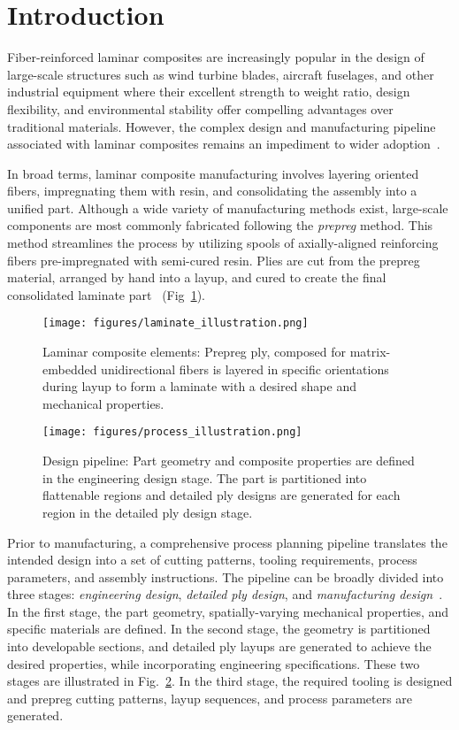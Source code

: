 \section{Introduction}
\label{sec:intro}
Fiber-reinforced laminar composites are increasingly popular in the design of large-scale structures such as wind turbine blades, aircraft fuselages, and other industrial equipment where their excellent strength to weight ratio, design flexibility, and environmental stability offer compelling advantages over traditional materials. However, the complex design and manufacturing pipeline associated with laminar composites remains an impediment to wider adoption~\cite{Grand_View_Research_2024}. 

In broad terms, laminar composite manufacturing involves layering oriented fibers, impregnating them with resin, and consolidating the assembly into a unified part. Although a wide variety of manufacturing methods exist, large-scale components are most commonly fabricated following the \emph{prepreg} method. This method streamlines the process by utilizing spools of axially-aligned reinforcing fibers pre-impregnated with semi-cured resin. Plies are cut from the prepreg material, arranged by hand into a layup, and cured to create the final consolidated laminate part~\cite{staab2015laminar} (Fig~\ref{fig:laminate_illustation}).

\begin{figure}
    \centering
    \texttt{[image: figures/laminate\_illustration.png]}
    \caption{Laminar composite elements: Prepreg ply, composed for matrix-embedded unidirectional fibers is layered in specific orientations during layup to form a laminate with a desired shape and mechanical properties.}
    \label{fig:laminate_illustation}
\end{figure}

\begin{figure}
    \centering
    \texttt{[image: figures/process\_illustration.png]}
    \caption{Design pipeline: Part geometry and composite properties are defined in the engineering design stage. The part is partitioned into flattenable regions and detailed ply designs are generated for each region in the detailed ply design stage.}
    \label{fig:design_pipeline}
\end{figure}

Prior to manufacturing, a comprehensive process planning pipeline translates the intended design into a set of cutting patterns, tooling requirements, process parameters, and assembly instructions. The pipeline can be broadly divided into three stages: \emph{engineering design}, \emph{detailed ply design}, and \emph{manufacturing design}~\cite{fibersim_siemens}. In the first stage, the part geometry, spatially-varying mechanical properties, and specific materials are defined. In the second stage, the geometry is partitioned into developable sections, and detailed ply layups are generated to achieve the desired properties, while incorporating engineering specifications. These two stages are illustrated in Fig.~\ref{fig:design_pipeline}. In the third stage, the required tooling is designed and prepreg cutting patterns, layup sequences, and process parameters are generated.

